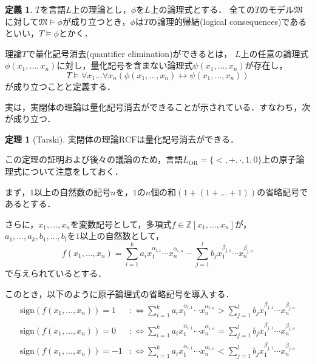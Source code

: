 \documentclass[uplatex, dvipdfmx]{jsarticle}
\newcommand{\Z}{\mathbb{Z}}
\newcommand{\M}{\mathfrak{M}}
\newcommand{\defiff}{ :\Leftrightarrow}
\newcommand{\RCF}{\mathrm{RCF}}
\newcommand{\sign}{\mathrm{sign}}
\theoremstyle{definition}
\newtheorem{definition}{定義}[section]
\newtheorem{theorem}{定理}[section]
\begin{document}
\begin{definition}
$T$を言語$L$上の理論とし，$\phi$を$L$上の論理式とする．%
全ての$T$のモデル$\M$に対して$\M \models \phi$が成り立つとき，$\phi$は$T$の論理的帰結(logical consequences)であるといい，$T \models \phi$とかく．

理論$T$で量化記号消去(quantifier elimination)ができるとは，
$L$上の任意の論理式$\phi(x_1,\dots,x_n)$に対し，量化記号を含まない論理式$\psi(x_1,\dots, x_n)$が存在し，
\begin{equation*}
     T \models \forall x_1 \dots \forall x_n(\phi(x_1,\dots,x_n) \leftrightarrow \psi(x_1, \dots, x_n))
\end{equation*}
が成り立つことと定義する．
\end{definition}


実は，実閉体の理論は量化記号消去ができることが示されている．すなわち，次が成り立つ．

\begin{theorem}[Tarski]\label{theorem:Tarski}
     実閉体の理論$\RCF$は量化記号消去ができる．
\end{theorem}

この定理の証明および後々の議論のため，言語$L_\mathrm{OR} = \{<, +, \cdot, 1, 0\}$上の原子論理式について注意をしておく．

まず，$1$以上の自然数の記号$n$を，$1$の$n$個の和$(1 + (1 + \dots + 1 ))$の省略記号であるとする．

さらに，$x_1, \dots, x_n$を変数記号として，多項式$f \in \Z[x_1, \dots, x_n]$が，$a_1, \dots, a_k, b_1, \dots, b_l$を$1$以上の自然数として，
\[
     f(x_1, \dots, x_n) = \sum_{i=1}^k a_i x_1^{\alpha_{i,1}} \cdots x_n^{\alpha_{i,n}} - \sum_{j=1}^l b_j x_1^{\beta_{j,1}} \cdots x_n^{\beta_{j,n}}
\]
で与えられているとする．

このとき，以下のように原子論理式の省略記号を導入する．
\begin{align*}
     \sign (f(x_1, \dots, x_n)) = 1 &\defiff \sum_{i=1}^k a_i x_1^{\alpha_{i,1}} \cdots x_n^{\alpha_{i,n}} > \sum_{j=1}^l b_j x_1^{\beta_{j,1}} \cdots x_n^{\beta_{j,n}}\\
     \sign (f(x_1, \dots, x_n)) = 0 &\defiff \sum_{i=1}^k a_i x_1^{\alpha_{i,1}} \cdots x_n^{\alpha_{i,n}} = \sum_{j=1}^l b_j x_1^{\beta_{j,1}} \cdots x_n^{\beta_{j,n}}\\
     \sign (f(x_1, \dots, x_n)) = -1 &\defiff \sum_{i=1}^k a_i x_1^{\alpha_{i,1}} \cdots x_n^{\alpha_{i,n}} < \sum_{j=1}^l b_j x_1^{\beta_{j,1}} \cdots x_n^{\beta_{j,n}}
\end{align*}
\end{document}

